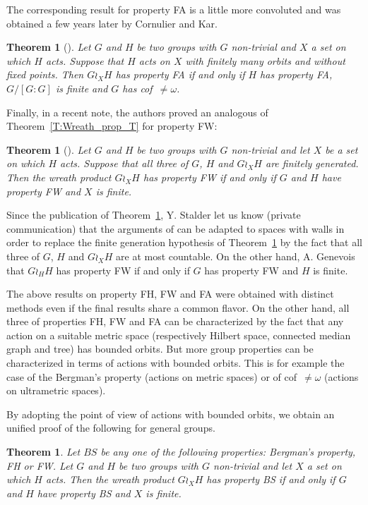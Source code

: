 \documentclass[a4paper]{article}
\newtheorem{thm}[lem]{Theorem}
\theoremstyle{definition}
\begin{document}
The corresponding result for property FA is a little more convoluted and was obtained a few years later by Cornulier and Kar.
%
%
\begin{thm}[\cite{Cornulier2011}]\label{Thm:FACK}
Let $G$ and $H$ be two groups with $G$ non-trivial and $X$ a set on which $H$ acts. Suppose that $H$ acts on $X$ with finitely many orbits and without fixed points.
Then $G\wr_XH$ has property FA if and only if $H$ has property FA, $G/[G:G]$ is finite and $G$ has cof~$\neq\omega$.
\end{thm}
%
%
Finally, in a recent note, the authors proved an analogous of Theorem~\ref{T:Wreath_prop_T} for property FW:
%
%
\begin{thm}[\cite{LS2020}]\label{Thm:PropFW}
Let $G$ and $H$ be two groups with $G$ non-trivial and let $X$ be a set on which $H$ acts. Suppose that all three of $G$, $H$ and $G\wr_XH$ are finitely generated. Then the wreath product $G \wr_X H$ has property FW if and only if $G$ and $H$ have property FW and $X$ is finite.
\end{thm}
%
%
Since the publication of Theorem~\ref{Thm:PropFW}, Y. Stalder let us know (private communication) that the arguments of \cite{LS2020} can be adapted to spaces with walls in order to replace the finite generation hypothesis of Theorem~\ref{Thm:PropFW} by the fact that all three of $G$, $H$ and $G\wr_XH$ are at most countable.
On the other hand, A. Genevois that $G\wr_HH$ has property FW if and only if $G$ has property FW and $H$ is finite.

The above results on property FH, FW and FA were obtained with distinct methods even if the final results share a common flavor.
On the other hand, all three of properties FH, FW and FA can be characterized by the fact that any action on a suitable metric space (respectively Hilbert space, connected median graph and tree) has bounded orbits.
But more group properties can be characterized in terms of actions with bounded orbits. This is for example the case of the Bergman's property (actions on metric spaces) or of cof~$\neq\omega$ (actions on ultrametric spaces).

By adopting the point of view of actions with bounded orbits, we obtain an unified proof of the following for general groups.
%
%
\begin{thm}\label{Thm:Main}
Let $BS$ be any one of the following properties: Bergman's property, FH or FW.
Let $G$ and $H$ be two groups with $G$ non-trivial and let $X$ a set on which $H$ acts. Then the wreath product $G \wr_X H$ has property BS if and only if $G$ and $H$ have property BS and $X$ is finite.
\end{thm}
\end{document}
